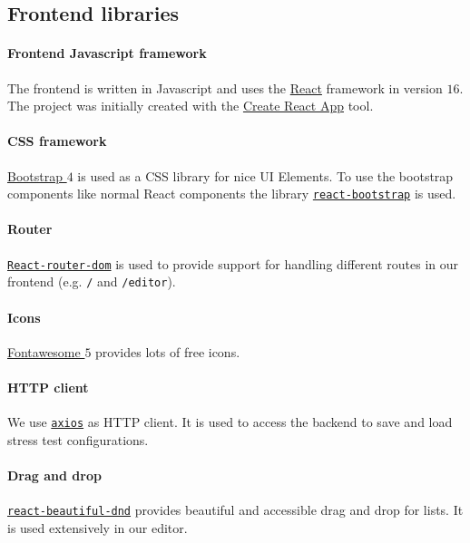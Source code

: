 \subsection{Frontend libraries}

\paragraph{Frontend Javascript framework}
The frontend is written in Javascript and uses the \href{https://reactjs.org}{React} framework in version $16$.
The project was initially created with the \href{https://create-react-app.dev}{Create React App} tool.

\paragraph{CSS framework}
\href{https://getbootstrap.com}{Bootstrap $4$} is used as a CSS library for nice UI Elements. 
To use the bootstrap components like normal React components the library \texttt{\href{https://react-bootstrap.github.io}{react-bootstrap}} is used.

\paragraph{Router}
\texttt{\href{https://reacttraining.com/react-router/web/guides/quick-start}{React-router-dom}} is used to provide support for handling different routes in our frontend (e.g. \texttt{/} and \texttt{/editor}).

\paragraph{Icons}
\href{https://fontawesome.com}{Fontawesome $5$} provides lots of free icons.

\paragraph{HTTP client}
We use \texttt{\href{https://github.com/axios/axios}{axios}} as HTTP client.
It is used to access the backend to save and load stress test configurations.

\paragraph{Drag and drop}
\texttt{\href{https://github.com/atlassian/react-beautiful-dnd}{react-beautiful-dnd}} provides beautiful and accessible drag and drop for lists.
It is used extensively in our editor.

